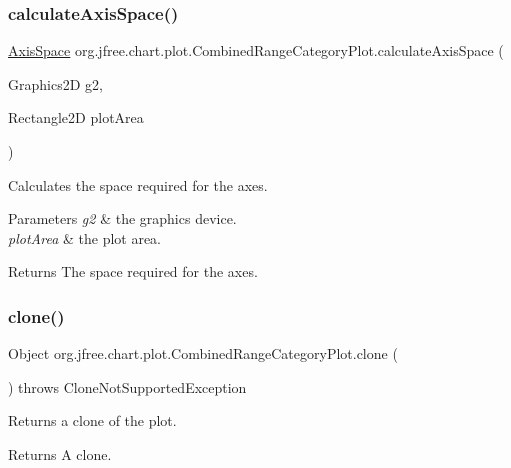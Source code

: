 \subsubsection{\texorpdfstring{calculate\+Axis\+Space()}{calculateAxisSpace()}}
{\footnotesize\ttfamily \mbox{\hyperlink{classorg_1_1jfree_1_1chart_1_1axis_1_1_axis_space}{Axis\+Space}} org.\+jfree.\+chart.\+plot.\+Combined\+Range\+Category\+Plot.\+calculate\+Axis\+Space (\begin{DoxyParamCaption}\item[{Graphics2D}]{g2,  }\item[{Rectangle2D}]{plot\+Area }\end{DoxyParamCaption})\hspace{0.3cm}{\ttfamily [protected]}}

Calculates the space required for the axes.


\begin{DoxyParams}{Parameters}
{\em g2} & the graphics device. \\
\hline
{\em plot\+Area} & the plot area.\\
\hline
\end{DoxyParams}
\begin{DoxyReturn}{Returns}
The space required for the axes. 
\end{DoxyReturn}
\mbox{\label{classorg_1_1jfree_1_1chart_1_1plot_1_1_combined_range_category_plot_aefcf768f8caca0e448c307a5533a26cd}} 
\subsubsection{\texorpdfstring{clone()}{clone()}}
{\footnotesize\ttfamily Object org.\+jfree.\+chart.\+plot.\+Combined\+Range\+Category\+Plot.\+clone (\begin{DoxyParamCaption}{ }\end{DoxyParamCaption}) throws Clone\+Not\+Supported\+Exception}

Returns a clone of the plot.

\begin{DoxyReturn}{Returns}
A clone.
\end{DoxyReturn}

